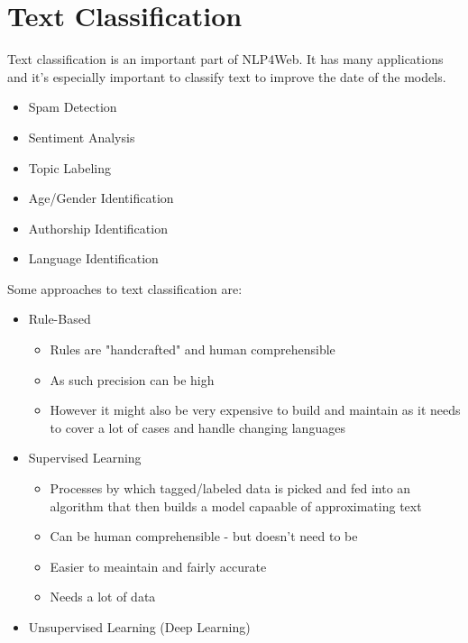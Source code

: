 \documentclass[
../../NLP4W_Summary.tex,
]
{subfiles}
\begin{document}
\section{Text Classification}
Text classification is an important part of NLP4Web. It has many applications and it's especially important to classify text to improve the date of the models.

\begin{defbox}
    \begin{itemize}
        \item Spam Detection
        \item Sentiment Analysis
        \item Topic Labeling
        \item Age/Gender Identification
        \item Authorship Identification
        \item Language Identification
    \end{itemize}
\end{defbox}

Some approaches to text classification are:

\begin{defbox}
    \begin{itemize}
        \item Rule-Based
        \begin{itemize}
            \item Rules are "handcrafted" and human comprehensible
            \item As such precision can be high
            \item However it might also be very expensive to build and maintain as it needs to cover a lot of cases and handle changing languages
        \end{itemize}
        \item Supervised Learning
        \begin{itemize}
            \item Processes by which tagged/labeled data is picked and fed into an algorithm that then builds a model capaable of approximating text
            \item Can be human comprehensible - but doesn't need to be
            \item Easier to meaintain and fairly accurate
            \item Needs a lot of data
        \end{itemize}
        \item Unsupervised Learning (Deep Learning)
    \end{itemize}
\end{defbox}
\end{document}
